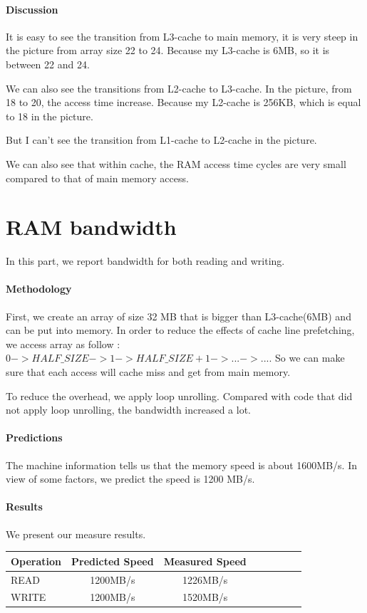 \paragraph{Discussion}
It is easy to see the transition from L3-cache to main memory, it is very steep in the picture from array size 22 to 24. Because my L3-cache is 6MB, so it is between 22 and 24.

We can also see the transitions from L2-cache to L3-cache. In the picture, from 18 to 20, the access time increase. Because my L2-cache is 256KB, which is equal to 18 in the picture.

But I can't see the transition from L1-cache to L2-cache in the picture.

We can also see that within cache, the RAM access time cycles are very small compared to that of main memory access.

\section{RAM bandwidth}
In this part, we report bandwidth for both reading and writing.

\paragraph{Methodology}
First, we create an array of size 32 MB that is bigger than L3-cache(6MB) and can be put into memory. In order to reduce the effects of cache line prefetching, we access array as follow : $0 -> HALF\_SIZE -> 1 -> HALF\_SIZE+1 -> ... -> ...$. So we can make sure that each access will cache miss and get from main memory.

To reduce the overhead, we apply loop unrolling. Compared with code that did not apply loop unrolling, the bandwidth increased  a lot.

\paragraph{Predictions}
The machine information tells us that the memory speed is about 1600MB/s. In view of some factors, we predict the speed is 1200 MB/s.

\paragraph{Results}
We present our measure results.

\begin{center}
\begin{tabular}{l*{6}{c}r}
Operation             & Predicted Speed & Measured Speed  \\
\hline
READ & 1200MB/s & 1226MB/s \\
WRITE & 1200MB/s & 1520MB/s \\

\end{tabular}
\end{center}

